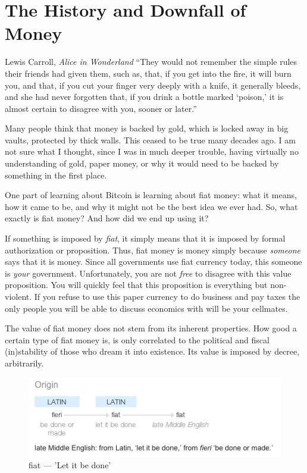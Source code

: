 \chapter{The History and Downfall of Money}
\label{les:12}

\begin{chapquote}{Lewis Carroll, \textit{Alice in Wonderland}}
``They would not remember the simple rules their friends had given them, such
as, that, if you get into the fire, it will burn you, and that, if you cut your
finger very deeply with a knife, it generally bleeds, and she had never
forgotten that, if you drink a bottle marked `poison,' it is almost certain to
disagree with you, sooner or later.''
\end{chapquote}

Many people think that money is backed by gold, which is locked away in
big vaults, protected by thick
walls. This ceased to be true many decades ago. I am not sure what I
thought, since I was in much deeper trouble, having virtually no
understanding of gold, paper money, or why it would need to be backed by
something in the first place.

One part of learning about Bitcoin is learning about fiat money: what it
means, how it came to be, and why it might not be the best idea we ever
had. So, what exactly is fiat money? And how did we end up using it?

If something is imposed by \textit{fiat}, it simply means that it is imposed by
formal authorization or proposition. Thus, fiat money is money simply
because \textit{someone} says that it is money. Since all governments use fiat
currency today, this someone is \textit{your} government. Unfortunately, you
are not \textit{free} to disagree with this value proposition. You will quickly
feel that this proposition is everything but non-violent. If you refuse
to use this paper currency to do business and pay taxes the only people
you will be able to discuss economics with will be your cellmates.

The value of fiat money does not stem from its inherent properties. How
good a certain type of fiat money is, is only correlated to the
political and fiscal (in)stability of those who dream it into existence.
Its value is imposed by decree, arbitrarily.

\begin{figure}
  \includegraphics{assets/images/fiat-definition.png}
  \caption{fiat --- 'Let it be done'}
  \label{fig:fiat-definition}
\end{figure}

